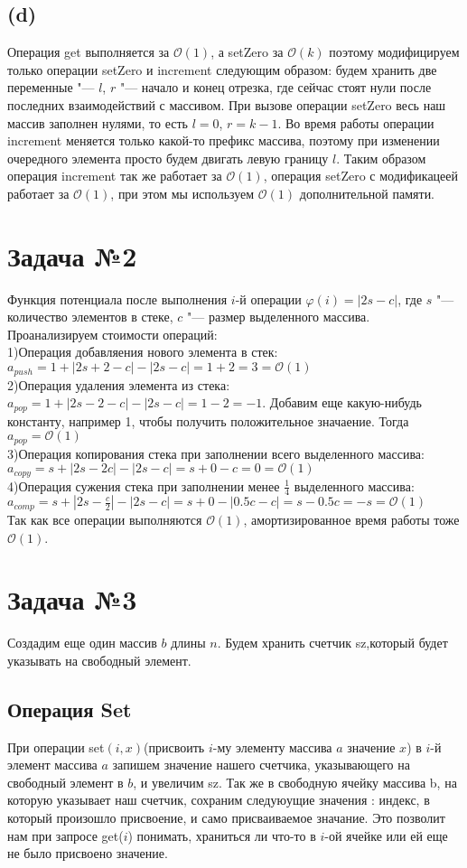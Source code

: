 \documentclass{article}
\begin{document}
\subsection*{(d)}
Операция get выполняется за $\mathcal{O}(1)$, а setZero за $\mathcal{O}(k)$ поэтому 
модифицируем только операции setZero и increment следующим образом: будем хранить две переменные "--- $l$, $r$ "--- начало и конец отрезка, где сейчас стоят нули после последних взаимодействий с массивом. При вызове операции setZero весь наш массив заполнен нулями, то есть $l = 0$, $r = k - 1$. Во время работы операции increment меняется только какой-то префикс массива, поэтому при изменении очередного элемента просто будем двигать левую границу $l$. Таким образом операция increment так же работает за $\mathcal{O}(1)$, операция setZero с модификацеей работает за $\mathcal{O}(1)$, при этом мы используем $\mathcal{O}(1)$ дополнительной памяти.

\section*{Задача №2}
Функция потенциала после выполнения $i$-й операции $\varphi(i) = |2s - c|$, где $s$ "--- количество элементов в стеке, $c$ "--- размер выделенного массива. Проанализируем стоимости операций:
\\
1)Операция добавляения нового элемента в стек: $a_{push} = 1 + |2s + 2 - c| - |2s - c| = 1 + 2 = 3 = \mathcal{O}(1)$ 
\\
2)Операция удаления элемента из стека: $a_{pop} = 1 + |2s - 2 - c| - |2s - c| = 1 - 2 = -1$. Добавим еще какую-нибудь константу, например 1, чтобы получить положительное значаение. Тогда $a_{pop} = \mathcal{O}(1)$
\\ 3)Операция копирования стека при заполнении всего выделенного массива: $a_{copy} = s + |2s - 2c| - |2s - c| = s + 0 - c = 0 = \mathcal{O}(1)$ 
\\
4)Операция сужения стека при заполнении менее $\frac{1}{4}$ выделенного массива: $a_{comp} = s + |2s - \frac{c}{2}| - |2s - c| = s + 0 - |0.5c - c| = s - 0.5c = -s = \mathcal{O}(1)$
\\
Так как все операции выполняются $\mathcal{O}(1)$, амортизированное время работы тоже $\mathcal{O}(1)$.
\section*{Задача №3}
Создадим еще один массив $b$ длины $n$. Будем хранить счетчик sz,который будет указывать на свободный элемент.
\subsection*{Операция Set}
 При операции set$(i, x)$(присвоить $i$-му элементу массива $a$ значение $x$) в $i$-й элемент массива $a$ запишем значение нашего счетчика, указывающего на свободный элемент в $b$, и увеличим sz. Так же в свободную ячейку массива b, на которую указывает наш счетчик,  сохраним следуюущие значения : индекс, в который произошло присвоение, и само присваиваемое значание. 
Это позволит нам при запросе get($i$) понимать, храниться ли что-то в $i$-ой ячейке или ей еще не было присвоено значение.
\end{document}
